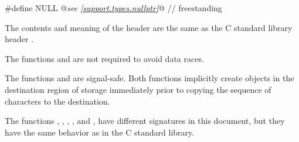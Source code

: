 \begin{codeblock}
#define NULL @\textit{see \ref{support.types.nullptr}}@                                                // freestanding
\end{codeblock}

\pnum
The contents and meaning of the header 
are the same as the C standard library header .

\pnum
The functions  and  are not required to avoid data
races.

\pnum
{}%
%
The functions  and  are signal-safe.
Both functions implicitly create objects
in the destination region of storage
immediately prior to copying the sequence of characters to the destination.

\pnum
\begin{note}
The functions
, , , , and ,
have different signatures in this document,
but they have the same behavior as in the C standard library.
\end{note}

